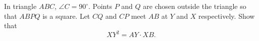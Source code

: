 In triangle $ABC$, $\angle C=90^\circ$. Points $P$ and $Q$ are chosen outside the triangle so that $ABPQ$ is a square. Let $CQ$ and $CP$ meet $AB$ at $Y$ and $X$ respectively. Show that
\[
XY^2=AY\cdot XB .
\]
